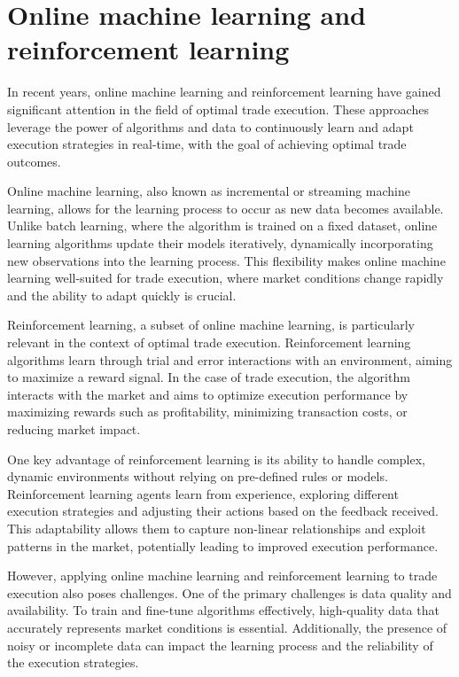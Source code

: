 \section{Online machine learning and reinforcement learning}\label{section:OMLandRL}
    In recent years, online machine learning and reinforcement learning have gained significant attention in the field of optimal trade execution. These approaches leverage the power of algorithms and data to continuously learn and adapt execution strategies in real-time, with the goal of achieving optimal trade outcomes.

    Online machine learning, also known as incremental or streaming machine learning, allows for the learning process to occur as new data becomes available. Unlike batch learning, where the algorithm is trained on a fixed dataset, online learning algorithms update their models iteratively, dynamically incorporating new observations into the learning process. This flexibility makes online machine learning well-suited for trade execution, where market conditions change rapidly and the ability to adapt quickly is crucial.

    Reinforcement learning, a subset of online machine learning, is particularly relevant in the context of optimal trade execution. Reinforcement learning algorithms learn through trial and error interactions with an environment, aiming to maximize a reward signal. In the case of trade execution, the algorithm interacts with the market and aims to optimize execution performance by maximizing rewards such as profitability, minimizing transaction costs, or reducing market impact.

    One key advantage of reinforcement learning is its ability to handle complex, dynamic environments without relying on pre-defined rules or models. Reinforcement learning agents learn from experience, exploring different execution strategies and adjusting their actions based on the feedback received. This adaptability allows them to capture non-linear relationships and exploit patterns in the market, potentially leading to improved execution performance.

    However, applying online machine learning and reinforcement learning to trade execution also poses challenges. One of the primary challenges is data quality and availability. To train and fine-tune algorithms effectively, high-quality data that accurately represents market conditions is essential. Additionally, the presence of noisy or incomplete data can impact the learning process and the reliability of the execution strategies.

